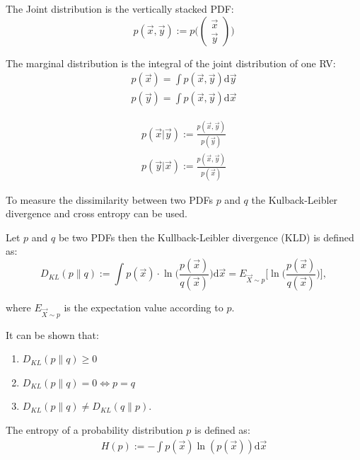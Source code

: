 \begin{definition}
The Joint distribution is the vertically stacked PDF:
\begin{equation}
    p(\vec{x},\vec{y}) := 
    p\Biggl(\begin{pmatrix}\vec{x}\\\vec{y}\end{pmatrix}\Biggr)
\end{equation}
\end{definition}

\begin{definition}
The marginal distribution is the integral of the joint distribution of one RV:
\begin{align}
    p(\vec{x}) = \int p(\vec{x},\vec{y})\mathrm{d}\vec{y} \\
    p(\vec{y}) = \int p(\vec{x},\vec{y})\mathrm{d}\vec{x}
\end{align}
\end{definition}

\begin{definition}
\begin{align}
    p(\vec{x}|\vec{y}) := \frac{p(\vec{x},\vec{y})}{p(\vec{y})} \\
    p(\vec{y}|\vec{x}) := \frac{p(\vec{x},\vec{y})}{p(\vec{x})}
    \label{eq:cond}
\end{align}
\end{definition}

To measure the dissimilarity between two PDFs $p$ and $q$ the Kulback-Leibler divergence and cross entropy can be used.
\begin{definition}
Let $p$ and $q$ be two PDFs then the Kullback-Leibler divergence  (KLD) \cite{Kullback1951Mar} is defined as:
\begin{equation}
    D_{KL}(p \parallel q) := \int p(\vec{x}) \cdot \ln\biggl(\frac{p(\vec{x})}{q(\vec{x})}\biggr)\mathrm{d}\vec{x} = E_{\vec{X} \sim p} \biggl[\ln\biggl(\frac{p(\vec{x})}{q(\vec{x})}\biggr)\biggr],
\end{equation}
\end{definition}
where $E_{\vec{X}\sim p}$ is the expectation value according to $p$.

It can be shown that:
\begin{enumerate}
    \item $D_{KL}(p \parallel q) \geq 0$
    \item $D_{KL}(p \parallel q) = 0 \Leftrightarrow p = q$
    \item $D_{KL}(p \parallel q) \neq D_{KL}(q \parallel p)$.
    \label{eq:prop_KL}
\end{enumerate}
\begin{definition}[Entropy]
The entropy of a probability distribution $p$ is defined as:
\begin{align}
    H(p) := -\int p(\vec{x})\ln(p(\vec{x}))\mathrm{d}\vec{x}
\end{align}
\end{definition}

